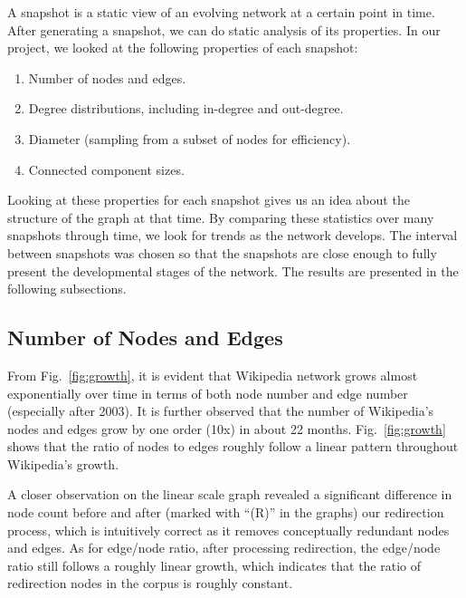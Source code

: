 \documentclass[10pt,twocolumn]{article}
\begin{document}
A snapshot is a static view of an evolving network at a certain point in time. After generating a snapshot, we can do static analysis of its properties. In our project, we looked at the following properties of each snapshot:
\begin{enumerate}
\item Number of nodes and edges.
\item Degree distributions, including in-degree and out-degree.
\item Diameter (sampling from a subset of nodes for efficiency).
\item Connected component sizes.
\end{enumerate}

Looking at these properties for each snapshot gives us an idea about the structure of the graph at that time. By comparing these statistics over many snapshots through time, we look for trends as the network develops. The interval between snapshots was chosen so that the snapshots are close enough to fully present the developmental stages of the network. The results are presented in the following subsections.

\subsection{Number of Nodes and Edges}
From Fig.~\ref{fig:growth}, it is evident that Wikipedia network grows almost exponentially over time in terms of both node number and edge number (especially after 2003). It is further observed that the number of Wikipedia's nodes and edges grow by one order (10x) in about 22 months. Fig.~\ref{fig:growth} shows that the ratio of nodes to edges roughly follow a linear pattern throughout Wikipedia's growth.

A closer observation on the linear scale graph revealed a significant difference in node count before and after (marked with ``(R)'' in the graphs) our redirection process, which is intuitively correct as it removes conceptually redundant nodes and edges. As for edge/node ratio, after processing redirection, the edge/node ratio still follows a roughly linear growth, which indicates that the ratio of redirection nodes in the corpus is roughly constant.
\end{document}
